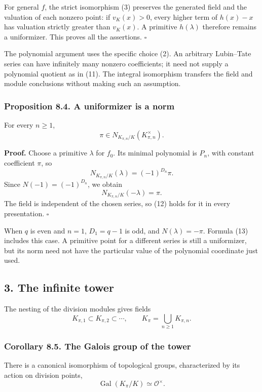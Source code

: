 \documentclass[11pt,a4paper]{article}
\begin{document}
For general \(f\), the strict isomorphism (3) preserves the generated
field and the valuation of each nonzero point: if \(v_K(x)>0\), every
higher term of \(h(x)-x\) has valuation strictly greater than
\(v_K(x)\). A primitive \(h(\lambda)\) therefore remains a uniformizer.
This proves all the assertions. \(\square\)

The polynomial argument uses the specific choice (2). An arbitrary
Lubin--Tate series can have infinitely many nonzero coefficients; it
need not supply a polynomial quotient as in (11). The integral
isomorphism transfers the field and module conclusions without making
such an assumption.

\subsubsection{Proposition 8.4. A uniformizer is a
norm}\label{proposition-8.4.-a-uniformizer-is-a-norm}

For every \(n\geq1\), \[
\pi\in N_{K_{\pi,n}/K}(K_{\pi,n}^{\times}).
\tag{12}
\]

\textbf{Proof.} Choose a primitive \(\lambda\) for \(f_0\). Its minimal
polynomial is \(P_n\), with constant coefficient \(\pi\), so \[
N_{K_{\pi,n}/K}(\lambda)=(-1)^{D_n}\pi.
\] Since \(N(-1)=(-1)^{D_n}\), we obtain \[
N_{K_{\pi,n}/K}(-\lambda)=\pi.
\tag{13}
\] The field is independent of the chosen series, so (12) holds for it
in every presentation. \(\square\)

When \(q\) is even and \(n=1\), \(D_1=q-1\) is odd, and
\(N(\lambda)=-\pi\). Formula (13) includes this case. A primitive point
for a different series is still a uniformizer, but its norm need not
have the particular value of the polynomial coordinate just used.

\subsection{3. The infinite tower}\label{the-infinite-tower}

The nesting of the division modules gives fields \[
K_{\pi,1}\subset K_{\pi,2}\subset\cdots,\qquad
K_\pi=\bigcup_{n\geq1}K_{\pi,n}.
\tag{14}
\]

\subsubsection{Corollary 8.5. The Galois group of the
tower}\label{corollary-8.5.-the-galois-group-of-the-tower}

There is a canonical isomorphism of topological groups, characterized by
its action on division points, \[
\operatorname{Gal}(K_\pi/K)\simeq\mathcal O^\times.
\tag{15}
\]
\end{document}
